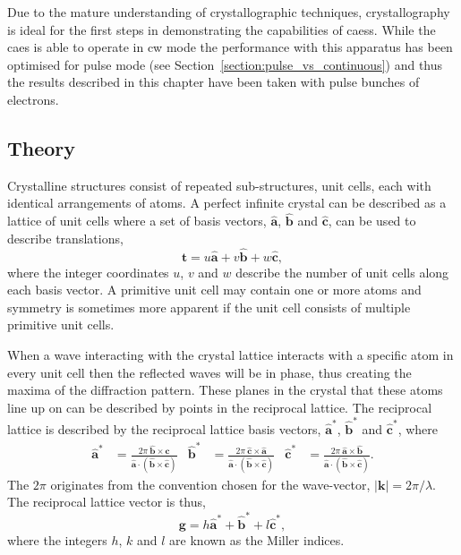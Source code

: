 Due to the mature understanding of crystallographic techniques, crystallography is ideal for the first steps in demonstrating the capabilities of \glspl{caes}.
While the \gls{caes} is able to operate in \gls{cw} mode the performance with this apparatus has been optimised for pulse mode (see Section~\ref{section:pulse_vs_continuous}) and thus the results described in this chapter have been taken with pulse bunches of electrons.

\subsection{Theory}

Crystalline structures consist of repeated sub-structures, unit cells, each with identical arrangements of atoms.
A perfect infinite crystal can be described as a lattice of unit cells where a set of basis vectors, $\mathbf{\hat{a}}$, $\mathbf{\hat{b}}$ and $\mathbf{\hat{c}}$, can be used to describe translations,
\begin{equation}
\mathbf{t} = u\mathbf{\hat{a}} + v\mathbf{\hat{b}} + w\mathbf{\hat{c}},
\end{equation}
where the integer coordinates $u$, $v$ and $w$ describe the number of unit cells along each basis vector.
A primitive unit cell may contain one or more atoms and symmetry is sometimes more apparent if the unit cell consists of multiple primitive unit cells.

When a wave interacting with the crystal lattice interacts with a specific atom in every unit cell then the reflected waves will be in phase, thus creating the maxima of the diffraction pattern.
These planes in the crystal that these atoms line up on can be described by points in the reciprocal lattice.
The reciprocal lattice is described by the reciprocal lattice basis vectors, $\mathbf{\hat{a}^*}$, $\mathbf{\hat{b}^*}$ and $\mathbf{\hat{c}^*}$, where
\begin{align}
\mathbf{\hat{a}^*}&=\frac{2\pi\:\mathbf{\hat{b}}\times\mathbf{\hat{c}}}{\mathbf{\hat{a}}\cdot (\mathbf{\hat{b}} \times \mathbf{\hat{c}})}  &  \mathbf{\hat{b}^*}&=\frac{2\pi\:\mathbf{\hat{c}}\times\mathbf{\hat{a}}}{\mathbf{\hat{a}}\cdot (\mathbf{\hat{b}} \times \mathbf{\hat{c}})}  &  \mathbf{\hat{c}^*}&=\frac{2\pi\:\mathbf{\hat{a}}\times\mathbf{\hat{b}}}{\mathbf{\hat{a}}\cdot (\mathbf{\hat{b}} \times \mathbf{\hat{c}})}.
\end{align}
The $2\pi$ originates from the convention chosen for the wave-vector, $|\mathbf{k}|=2\pi/\lambda$. The reciprocal lattice vector is thus,
\begin{equation}
\mathbf{g} = h\mathbf{\hat{a}^*} + \mathbf{\hat{b}^*} + l\mathbf{\hat{c}^*},
\end{equation}
where the integers $h$, $k$ and $l$ are known as the Miller indices.

